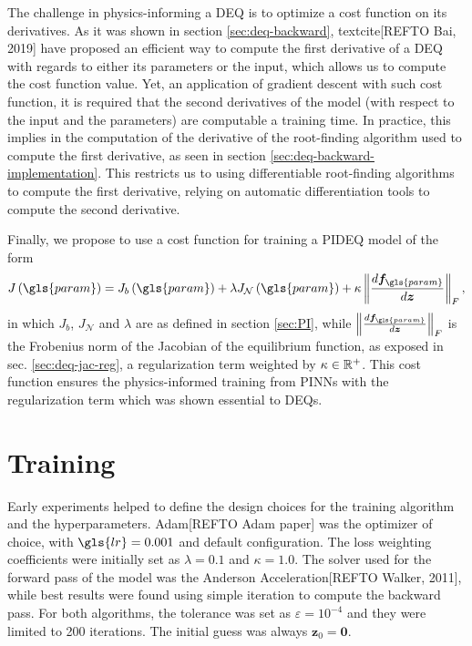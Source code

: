 The challenge in physics-informing a \gls{DEQ} is to optimize a cost function on its derivatives.
As it was shown in section \ref{sec:deq-backward}, textcite[REFTO Bai, 2019] have proposed an efficient way to compute the first derivative of a \gls{DEQ} with regards to either its parameters or the input, which allows us to compute the cost function value.
Yet, an application of gradient descent with such cost function, it is required that the second derivatives of the model (with respect to the input and the parameters) are computable a training time.
In practice, this implies in the computation of the derivative of the root-finding algorithm used to compute the first derivative, as seen in section \ref{sec:deq-backward-implementation}.\footnotemark
{}
This restricts us to using differentiable root-finding algorithms to compute the first derivative, relying on automatic differentiation tools to compute the second derivative.

Finally, we propose to use a cost function for training a \gls{PIDEQ} model of the form \[
    J\left( \gls{param} \right) = J_b\left( \gls{param} \right) + \lambda J_{\mathcal{N}}\left( \gls{param} \right) + \kappa \left\lVert \frac{d \bm{f}_{\gls{param}}}{d \bm{z}}\right\rVert_F
,\] 
in which $J_b$, $J_{\mathcal{N}}$ and $\lambda$ are as defined in section \ref{sec:PI}, while $\left\lVert \frac{d \bm{f}_{\gls{param}}}{d \bm{z}}\right\rVert_F$ is the Frobenius norm of the Jacobian of the equilibrium function, as exposed in sec. \ref{sec:deq-jac-reg}, a regularization term weighted by $\kappa \in \mathbb{R}^+$.
This cost function ensures the physics-informed training from \gls{PINN}s with the regularization term which was shown essential to \gls{DEQ}s.

\section{Training}

Early experiments helped to define the design choices for the training algorithm and the hyperparameters.
Adam[REFTO Adam paper] was the optimizer of choice, with $\gls{lr}=0.001$ and default configuration.
The loss weighting coefficients were initially set as $\lambda=0.1$ and $\kappa=1.0$.
The solver used for the forward pass of the model was the Anderson Acceleration[REFTO Walker, 2011], while best results were found using simple iteration to compute the backward pass.
For both algorithms, the tolerance was set as $\varepsilon=10^{-4}$ and they were limited to 200 iterations.
The initial guess was always $\bm{z}_0=\bm{0}$.

